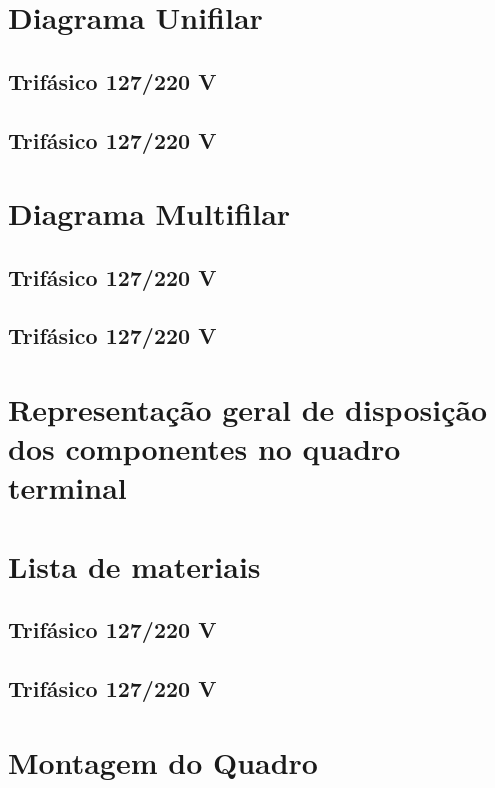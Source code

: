 \section{Diagrama Unifilar}

\subsection{Trifásico 127/220 V}

\subsection{Trifásico 127/220 V}

\section{Diagrama Multifilar}

\subsection{Trifásico 127/220 V}

\subsection{Trifásico 127/220 V}

\section{Representação geral de disposição dos componentes no quadro terminal}

\section{Lista de materiais}


\subsection{Trifásico 127/220 V}

\subsection{Trifásico 127/220 V}

\section{Montagem do Quadro}

